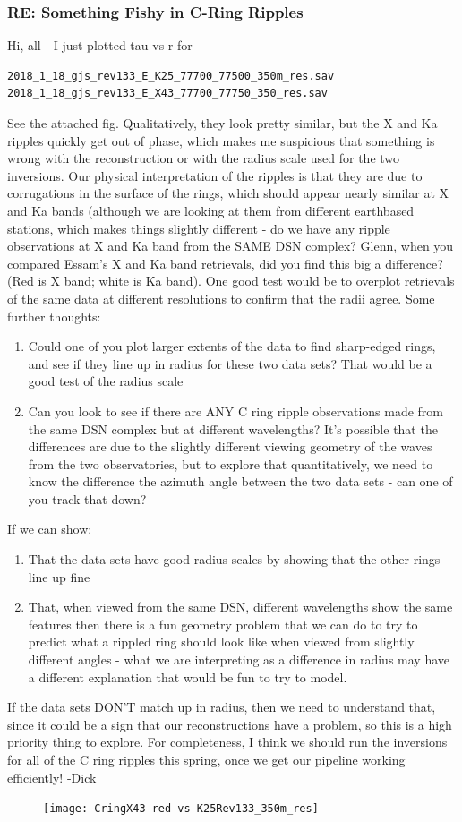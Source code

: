 \documentclass[crop=false,class=book]{standalone}
\begin{document}
\subsubsection{\footnotesize RE: Something Fishy in C-Ring Ripples}
Hi, all - I just plotted tau vs r for 
\begin{lstlisting}[language=bash]
2018_1_18_gjs_rev133_E_K25_77700_77500_350m_res.sav 
2018_1_18_gjs_rev133_E_X43_77700_77750_350_res.sav
\end{lstlisting}
See the attached fig. Qualitatively, they look pretty similar, but the X and Ka ripples quickly get out of phase, which makes me suspicious that something is wrong with the reconstruction or with the radius scale used for the two inversions. Our physical interpretation of the ripples is that they are due to corrugations in the surface of the rings, which should appear nearly similar at X and Ka bands (although we are looking at them from different earthbased stations, which makes things slightly different - do we have any ripple observations at X and Ka band from the SAME DSN complex? Glenn, when you compared Essam's X and Ka band retrievals, did you find this big a difference? (Red is X band; white is Ka band). One good test would be to overplot retrievals of the same data at different resolutions to confirm that the radii agree. Some further thoughts:
\begin{enumerate}
    \item Could one of you plot larger extents of the data to find sharp-edged rings, and see if they line up in radius for these two data sets? That would be a good test of the radius scale
    \item Can you look to see if there are ANY C ring ripple observations made from the same DSN complex but at different wavelengths? It's possible that the differences are due to the slightly different viewing geometry of the waves from the two observatories, but to explore that quantitatively, we need to know the difference the azimuth angle between the two data sets - can one of you track that down?
\end{enumerate}
If we can show:
\begin{enumerate}
    \item That the data sets have good radius scales by showing that the other rings line up fine
    \item That, when viewed from the same DSN, different wavelengths show the same features then there is a fun geometry problem that we can do to try to predict what a rippled ring should look like when viewed from slightly different angles - what we are interpreting as a difference in radius may have a different explanation that would be fun to try to model.
\end{enumerate}
If the data sets DON'T match up in radius, then we need to understand that, since it could be a sign that our reconstructions have a problem, so this is a high priority thing to explore. For completeness, I think we should run the inversions for all of the C ring ripples this spring, once we get our pipeline working efficiently! -Dick
\begin{figure}[H]
    \centering
    \texttt{[image: CringX43-red-vs-K25Rev133\_350m\_res]}
\end{figure}
\end{document}

